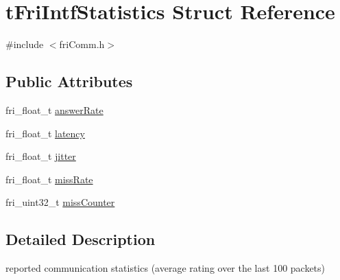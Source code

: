 \hypertarget{structtFriIntfStatistics}{\section{t\-Fri\-Intf\-Statistics \-Struct \-Reference}
\label{structtFriIntfStatistics}
}


{\ttfamily \#include $<$fri\-Comm.\-h$>$}

\subsection*{\-Public \-Attributes}
\begin{DoxyCompactItemize}
\item 
fri\-\_\-float\-\_\-t \hyperlink{structtFriIntfStatistics_aebfc203ffc0ecdeab0ea9980bf5ebff7}{answer\-Rate}
\item 
fri\-\_\-float\-\_\-t \hyperlink{structtFriIntfStatistics_a4d011bf7457df0c5af0a6babf7d575eb}{latency}
\item 
fri\-\_\-float\-\_\-t \hyperlink{structtFriIntfStatistics_abd760f07ee8a30dae44dac57c14a4099}{jitter}
\item 
fri\-\_\-float\-\_\-t \hyperlink{structtFriIntfStatistics_a3dd921bc87fa0a6f2f38a528748ce5e0}{miss\-Rate}
\item 
fri\-\_\-uint32\-\_\-t \hyperlink{structtFriIntfStatistics_ad6806c15b51e4ba6ea8fb3d756833bb6}{miss\-Counter}
\end{DoxyCompactItemize}


\subsection{\-Detailed \-Description}
reported communication statistics (average rating over the last 100 packets) 

